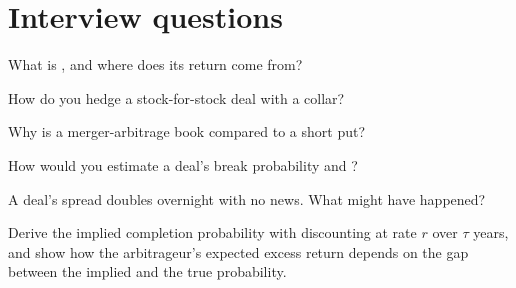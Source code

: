 \section{Interview questions}

\begin{interviewq}\label{iq:s1:merger-arbitrage:1}
What is , and where does its return come from?
\end{interviewq}

\begin{interviewq}\label{iq:s1:merger-arbitrage:2}
How do you hedge a stock-for-stock deal with a collar?
\end{interviewq}

\begin{interviewq}\label{iq:s1:merger-arbitrage:3}
Why is a merger-arbitrage book compared to a short put?
\end{interviewq}

\begin{interviewq}\label{iq:s1:merger-arbitrage:4}
How would you estimate a deal's break probability and ?
\end{interviewq}

\begin{interviewq}\label{iq:s1:merger-arbitrage:5}
A deal's spread doubles overnight with no news. What might have happened?
\end{interviewq}

\begin{interviewq}\label{iq:s1:merger-arbitrage:6}
Derive the implied completion probability with discounting at rate $r$ over $\tau$ years, and show how the arbitrageur's expected excess return depends on
the gap between the implied and the true probability.
\end{interviewq}
